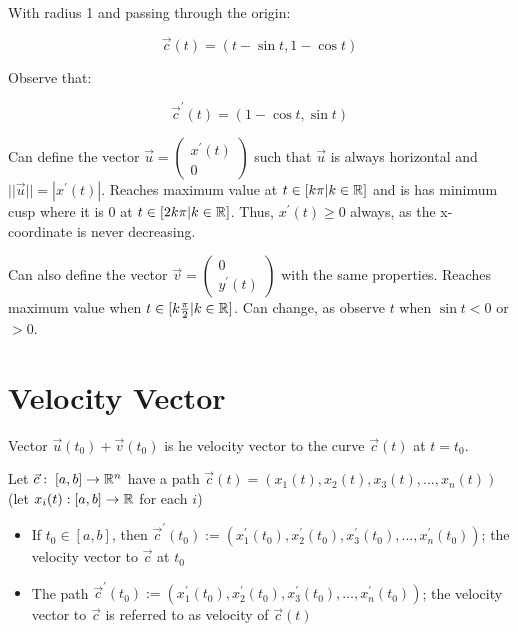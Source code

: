 With radius 1 and passing through the origin:

\[\vec{c}(t)=(t-\sin t, 1 - \cos t)\]

Observe that:

\[\vec{c}^\prime(t)=(1-\cos t, \sin t)\]

Can define the vector $\vec{u}=\left(\begin{array}{c}x^{\prime}(t) \\0\end{array}\right)$
such that $\vec{u}$ is always horizontal and $||\vec{u}||=|x^\prime(t)|$. Reaches maximum
value at $t\in[k\pi|k\in\mathbb{R}]$ and is has minimum cusp where it is 0 at $t\in [2k\pi|k\in\mathbb{R}]$.
Thus, $x^\prime(t)\geq 0$ always, as the x-coordinate is never decreasing. \newline

\noindent
Can also define the vector $\vec{v}=\left(\begin{array}{c}0 \\y^{\prime}(t)\end{array}\right)$
with the same properties. Reaches maximum value when $t\in[k\frac{\pi}{2}|k\in\mathbb{R}]$.
Can change, as observe $t$ when $\sin t < 0$ or $ >0 $.

\section{Velocity Vector}

Vector $\vec{u}(t_0)+\vec{v}(t_0)$ is he velocity vector to the curve $\vec{c}(t)$ at $t=t_0$.\newline

\noindent
Let $\vec{c}:\;[a,b]\rightarrow \mathbb{R}^n$ have a path $\vec{c}(t)=\left(x_{1}(t), x_{2}(t), x_{3}(t), \ldots, x_{n}(t)\right)$ (let $x_i(t):[a,b]\rightarrow \mathbb{R}$ for each $i$)
\begin{itemize}
    \item If $t_0\in[a,b]$, then $\vec{c}^{\prime}\left(t_{0}\right):=\left(x_{1}^{\prime}\left(t_{0}\right), x_{2}^{\prime}\left(t_{0}\right), x_{3}^{\prime}\left(t_{0}\right), \ldots, x_{n}^{\prime}\left(t_{0}\right)\right)$; the velocity vector to $\vec{c}$ at $t_0$
    \item The path $\vec{c}^{\prime}\left(t_{0}\right):=\left(x_{1}^{\prime}\left(t_{0}\right), x_{2}^{\prime}\left(t_{0}\right), x_{3}^{\prime}\left(t_{0}\right), \ldots, x_{n}^{\prime}\left(t_{0}\right)\right)$; the velocity vector to $\vec{c}$ is referred to as velocity of $\vec{c}(t)$
\end{itemize}

